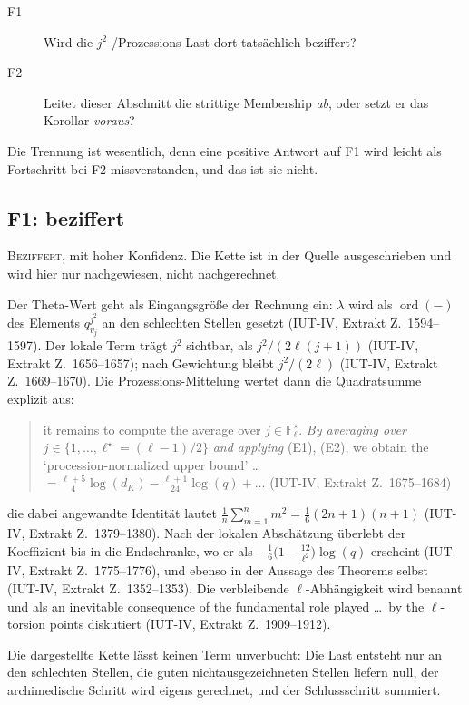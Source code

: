 \documentclass[11pt,a4paper]{article}
\theoremstyle{definition}
\newcommand{\ordd}{\operatorname{ord}}
\newcommand{\anchor}[2]{(#1, Extrakt Z.~#2)}
\begin{document}
\begin{description}
\item[F1] Wird die $j^2$-/Prozessions-Last dort tatsächlich beziffert?
\item[F2] Leitet dieser Abschnitt die strittige Membership \emph{ab}, oder setzt
  er das Korollar \emph{voraus}?
\end{description}

Die Trennung ist wesentlich, denn eine positive Antwort auf F1 wird leicht als
Fortschritt bei F2 missverstanden, und das ist sie nicht.

\subsection{F1: beziffert}

\textsc{Beziffert}, mit hoher Konfidenz. Die Kette ist in der Quelle
ausgeschrieben und wird hier nur nachgewiesen, nicht nachgerechnet.

Der Theta-Wert geht als Eingangsgröße der Rechnung ein: \glqq $\lambda$\grqq{} wird als
\glqq $\ordd(-)$\grqq{} des Elements $q_{v_j}^{j^2}$ an den schlechten Stellen gesetzt
\anchor{IUT-IV}{1594--1597}. Der lokale Term trägt $j^2$ sichtbar, als
$j^2/(2\ell(j+1))$ \anchor{IUT-IV}{1656--1657}; nach Gewichtung bleibt
$j^2/(2\ell)$ \anchor{IUT-IV}{1669--1670}. Die Prozessions-Mittelung wertet dann
die Quadratsumme explizit aus:

\begin{quote}\small
\glqq it remains to compute the average over $j \in \mathbb{F}_\ell^\star$.
\emph{By averaging over} $j \in \{1,\dots,\ell^\star = (\ell-1)/2\}$ \emph{and
applying} (E1), (E2), we obtain the `procession-normalized upper bound'
\dots\ $= \frac{\ell+5}{4}\log(d_K) - \frac{\ell+1}{24}\log(q) + \dots$\grqq
\hfill\anchor{IUT-IV}{1675--1684}
\end{quote}

die dabei angewandte Identität lautet $\frac{1}{n}\sum_{m=1}^{n} m^2 =
\frac{1}{6}(2n+1)(n+1)$ \anchor{IUT-IV}{1379--1380}. Nach der lokalen
Abschätzung überlebt der Koeffizient bis in die Endschranke, wo er als
$-\frac{1}{6}\bigl(1 - \frac{12}{\ell^2}\bigr)\log(q)$ erscheint
\anchor{IUT-IV}{1775--1776}, und ebenso in der Aussage des Theorems selbst
\anchor{IUT-IV}{1352--1353}. Die verbleibende $\ell$-Abhängigkeit wird benannt und
als \glqq an inevitable consequence of the fundamental role played \dots\ by the
$\ell$-torsion points\grqq{} diskutiert \anchor{IUT-IV}{1909--1912}.

Die dargestellte Kette lässt keinen Term unverbucht: Die Last entsteht
nur an den schlechten Stellen, die guten nichtausgezeichneten Stellen liefern
null, der archimedische Schritt wird eigens gerechnet, und der Schlussschritt
summiert.
\end{document}
